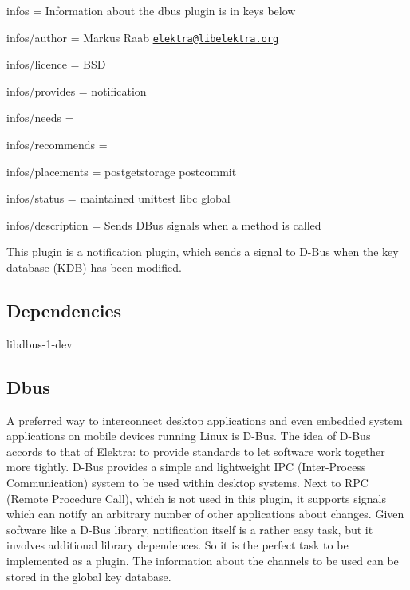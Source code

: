 
\begin{DoxyItemize}
\item infos = Information about the dbus plugin is in keys below
\item infos/author = Markus Raab \href{mailto:elektra@libelektra.org}{\tt elektra@libelektra.\+org}
\item infos/licence = B\+SD
\item infos/provides = notification
\item infos/needs =
\item infos/recommends =
\item infos/placements = postgetstorage postcommit
\item infos/status = maintained unittest libc global
\item infos/description = Sends D\+Bus signals when a method is called
\end{DoxyItemize}

This plugin is a notification plugin, which sends a signal to D-\/\+Bus when the key database (K\+DB) has been modified.

\subsection*{Dependencies}


\begin{DoxyItemize}
\item {\ttfamily libdbus-\/1-\/dev}
\end{DoxyItemize}

\subsection*{Dbus}

A preferred way to interconnect desktop applications and even embedded system applications on mobile devices running Linux is D-\/\+Bus. The idea of D-\/\+Bus accords to that of Elektra\+: to provide standards to let software work together more tightly. D-\/\+Bus provides a simple and lightweight I\+PC (Inter-\/\+Process Communication) system to be used within desktop systems. Next to R\+PC (Remote Procedure Call), which is not used in this plugin, it supports signals which can notify an arbitrary number of other applications about changes. Given software like a D-\/\+Bus library, notification itself is a rather easy task, but it involves additional library dependences. So it is the perfect task to be implemented as a plugin. The information about the channels to be used can be stored in the global key database.

